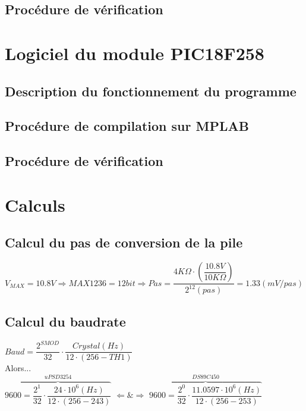 \documentclass[10pt,a4paper,final]{article}
\begin{document}
\begin{spacing}{1.5}
\subsection{Procédure de vérification}


\section{Logiciel du module PIC18F258}
\subsection{Description du fonctionnement du programme}

\subsection{Procédure de compilation sur MPLAB}

\subsection{Procédure de vérification}

\section{Calculs}
\subsection{Calcul du pas de conversion de la pile}
$V_{MAX}=10.8V \Rightarrow MAX1236  = 12 bit \Rightarrow Pas = \dfrac{4K\Omega \cdot \left(\dfrac{10.8V}{10K\Omega}\right)}{2^{12}(pas)} = 1.33(mV/pas)$
\subsection{Calcul du baudrate}
$Baud = \dfrac{2^{SMOD}}{32}\cdot\dfrac{Crystal (Hz)}{12\cdot(256 - TH1)}$\\


Alors...\\


$\overbrace{9600 = \dfrac{2^{1}}{32} \cdot \dfrac{24\cdot10^{6}(Hz)}{12\cdot(256 - 243)}}^{uPSD 3254} $ $\Leftarrow \& \Rightarrow $ $ \overbrace{9600 = \dfrac{2^{0}}{32}\cdot \dfrac{11.0597 \cdot 10^{6}(Hz)}{12\cdot(256 - 253)}}^{DS89C450}$





\pagebreak

\end{spacing}
\end{document}
